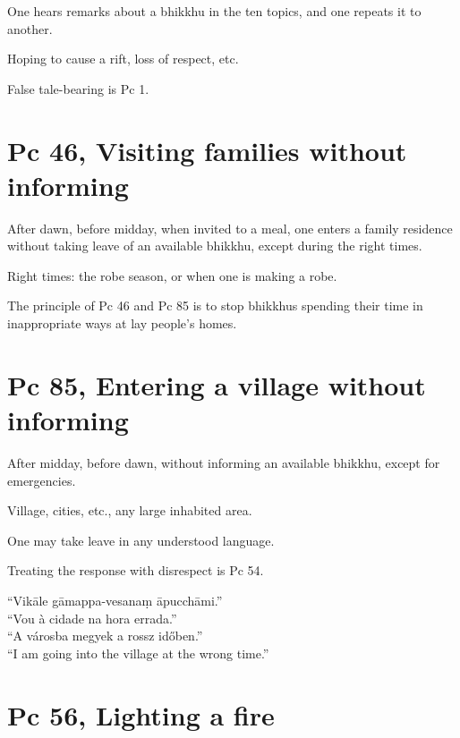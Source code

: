 One hears remarks about a bhikkhu in the ten topics, and one repeats it
to another.

Hoping to cause a rift, loss of respect, etc.

False tale-bearing is Pc 1.

\section{Pc 46, Visiting families without informing}

After dawn, before midday, when invited to a meal, one enters a family
residence without taking leave of an available bhikkhu, except during
the right times.

Right times: the robe season, or when one is making a robe.

The principle of Pc 46 and Pc 85 is to stop bhikkhus spending their time
in inappropriate ways at lay people's homes.

\section{Pc 85, Entering a village without informing}

\begin{multicols}{2}

After midday, before dawn, without informing an available bhikkhu,
except for emergencies.

Village, cities, etc., any large inhabited area.

One may take leave in any understood language.

Treating the response with disrespect is Pc 54.

``Vikāle gāmappa-vesanaṃ āpucchāmi.''\\
``Vou à cidade na hora errada.''\\
``A városba megyek a rossz időben.''\\
``I am going into the village at the wrong time.''

\end{multicols}

\section{Pc 56, Lighting a fire}

